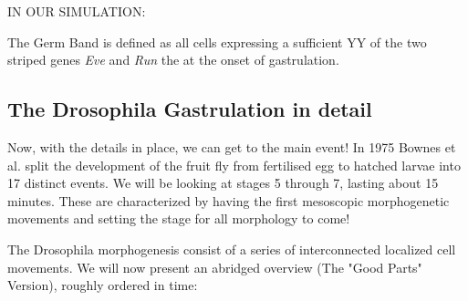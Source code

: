IN OUR SIMULATION: 

The Germ Band is defined as all cells expressing a sufficient YY of the two striped genes \textit{Eve} and \textit{Run} the at the onset of gastrulation. \cite{zallen2004patterned}



\subsection{The Drosophila Gastrulation in detail}
Now, with the details in place, we can get to the main event!
In 1975 Bownes et al. split the development of the fruit fly from fertilised egg to hatched larvae into 17 distinct events.\cite{bownes1975photographic} We will be looking at stages 5 through 7, lasting about 15 minutes. These are characterized by having the first mesoscopic morphogenetic movements and setting the stage for all morphology to come! 

The Drosophila morphogenesis consist of a series of interconnected localized cell movements. We will now present an abridged overview (The "Good Parts" Version), roughly ordered in time:
\newpage

